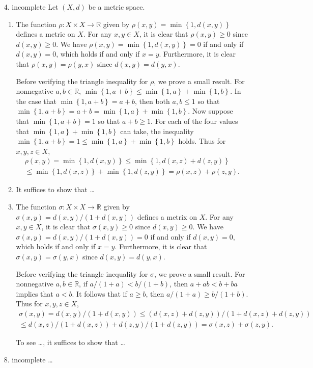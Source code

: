 \documentclass[11pt,leqno]{article}
\theoremstyle{plain}
\theoremstyle{definition}
\numberwithin{equation}{section}
\numberwithin{lem}{section}
\newcommand{\cbr}[1]{\left\{#1\right\}}
\begin{document}
\begin{enumerate}
  \item[4. incomplete] Let $(X,d)$ be a metric space.
  \begin{enumerate}
    \item The function $\rho\colon X\times X\to \mathbb R$ given by $\rho(x,y) = \min\cbr{1,d(x,y)}$ defines a metric on $X$. For any $x,y\in X$, it is clear that $\rho(x,y)\geq 0$ since $d(x,y)\geq 0$. We have $\rho(x,y) = \min\cbr{1,d(x,y)} = 0$ if and only if $d(x,y) = 0$, which holds if and only if $x = y$. Furthermore, it is clear that $\rho(x,y) = \rho(y,x)$ since $d(x,y) = d(y,x)$.
    
    Before verifying the triangle inequality for $\rho$, we prove a small result. For nonnegative $a,b\in\mathbb R$, $\min\cbr{1,a+b}\leq \min\cbr{1,a} + \min\cbr{1,b}$. In the case that $\min\cbr{1,a+b}= a+b$, then both $a,b\leq 1$ so that $\min\cbr{1,a+b} = a+b = \min\cbr{1,a} + \min\cbr{1,b}$. 
    Now suppose that $\min\cbr{1,a+b}= 1$ so that $a+b\geq 1$.
    For each of the four values that $\min\cbr{1,a} + \min\cbr{1,b}$ can take, the inequality $\min\cbr{1,a+b}= 1\leq \min\cbr{1,a} + \min\cbr{1,b}$ holds. Thus for $x,y,z\in X$, \begin{multline*}
      \rho(x,y) = \min\cbr{1,d(x,y)}\leq \min\cbr{1,d(x,z) + d(z,y)}\\\leq \min\cbr{1,d(x,z)} + \min\cbr{1,d(z,y)} = \rho(x,z) + \rho(z,y).
    \end{multline*}

    \item It suffices to show that \dots
    \item The function $\sigma\colon X\times X\to \mathbb R$ given by $\sigma(x,y) = d(x,y)/(1+d(x,y))$ defines a metrix on $X$. For any $x,y\in X$, it is clear that $\sigma(x,y) \geq 0$ since $d(x,y)\geq 0$. We have $\sigma(x,y) = d(x,y)/(1+d(x,y)) = 0$ if and only if $d(x,y) = 0$, which holds if and only if $x=y$. Furthermore, it is clear that $\sigma(x,y) = \sigma(y,x)$ since $d(x,y) = d(y,x)$.
    
    Before verifying the triangle inequality for $\sigma$, we prove a small result. For nonnegative $a,b\in \mathbb R$, if $a/(1+a)< b/(1+b)$, then $a+ ab < b + ba$ implies that $a<b$. It follows that if $a\geq b$, then $a/(1+a)\geq b/(1+b)$. Thus for $x,y,z\in X$, \begin{multline*}
      \sigma(x,y) = d(x,y)/(1+d(x,y)) \leq (d(x,z) + d(z,y))/(1+ d(x,z) + d(z,y))\\ \leq d(x,z)/(1+ d(x,z)) + d(z,y)/(1+d(z,y)) = \sigma(x,z) + \sigma(z,y).
    \end{multline*}

    To see \dots, it suffices to show that \dots
  \end{enumerate}
  
  \item[8. incomplete] \dots
\end{enumerate}
\end{document}
